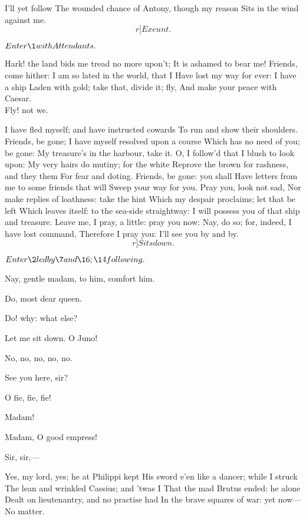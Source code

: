 \documentclass{book}
\begin{document}
	I'll yet follow
	The wounded chance of Antony, though my reason
	Sits in the wind against me. 	\[r]Exeunt.\]




	\(Enter \1 with Attendants.\)

\1	Hark! the land bids me tread no more upon't;
	It is ashamed to bear me! Friends, come hither:
	I am so lated in the world, that I
	Have lost my way for ever: I have a ship
	Laden with gold; take that, divide it; fly,
	And make your peace with Caesar. \\

	Fly! not we.

\1	I have fled myself; and have instructed cowards
	To run and show their shoulders. Friends, be gone;
	I have myself resolved upon a course
	Which has no need of you; be gone:
	My treasure's in the harbour, take it. O,
	I follow'd that I blush to look upon:
	My very hairs do mutiny; for the white
	Reprove the brown for rashness, and they them
	For fear and doting. Friends, be gone: you shall
	Have letters from me to some friends that will
	Sweep your way for you. Pray you, look not sad,
	Nor make replies of loathness: take the hint
	Which my despair proclaims; let that be left
	Which leaves itself: to the sea-side straightway:
	I will possess you of that ship and treasure.
	Leave me, I pray, a little: pray you now:
	Nay, do so; for, indeed, I have lost command,
	Therefore I pray you: I'll see you by and by. \[r]Sits down.\]


	\(Enter \2 led by \7 and \16; \14 following.\)

	Nay, gentle madam, to him, comfort him.

	Do, most dear queen.

\7	Do! why: what else?

\2	Let me sit down. O Juno!

\1	No, no, no, no, no.

	See you here, sir?

\1	O fie, fie, fie!

\7	Madam!

	Madam, O good empress!

	Sir, sir,---

\1	Yes, my lord, yes; he at Philippi kept
	His sword e'en like a dancer; while I struck
	The lean and wrinkled Cassius; and 'twas I
	That the mad Brutus ended: he alone
	Dealt on lieutenantry, and no practise had
	In the brave squares of war: yet now---No matter.
\end{document}

